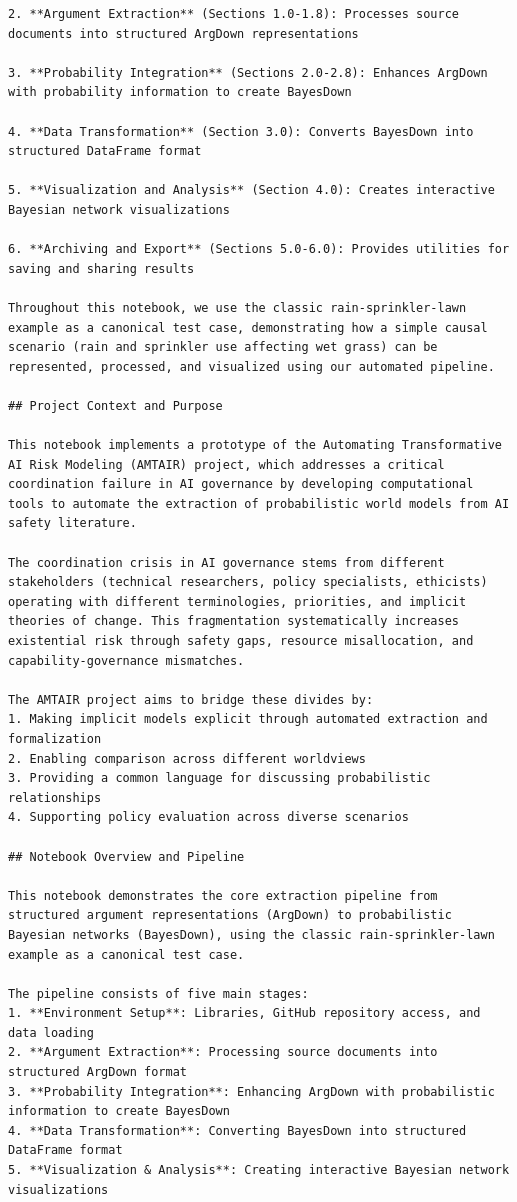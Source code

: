 \documentclass[
  11pt,
  letterpaper,
]{book}
\begin{document}
\begin{verbatim}
2. **Argument Extraction** (Sections 1.0-1.8): Processes source documents into structured ArgDown representations

3. **Probability Integration** (Sections 2.0-2.8): Enhances ArgDown with probability information to create BayesDown

4. **Data Transformation** (Section 3.0): Converts BayesDown into structured DataFrame format

5. **Visualization and Analysis** (Section 4.0): Creates interactive Bayesian network visualizations

6. **Archiving and Export** (Sections 5.0-6.0): Provides utilities for saving and sharing results

Throughout this notebook, we use the classic rain-sprinkler-lawn example as a canonical test case, demonstrating how a simple causal scenario (rain and sprinkler use affecting wet grass) can be represented, processed, and visualized using our automated pipeline.

## Project Context and Purpose

This notebook implements a prototype of the Automating Transformative AI Risk Modeling (AMTAIR) project, which addresses a critical coordination failure in AI governance by developing computational tools to automate the extraction of probabilistic world models from AI safety literature.

The coordination crisis in AI governance stems from different stakeholders (technical researchers, policy specialists, ethicists) operating with different terminologies, priorities, and implicit theories of change. This fragmentation systematically increases existential risk through safety gaps, resource misallocation, and capability-governance mismatches.

The AMTAIR project aims to bridge these divides by:
1. Making implicit models explicit through automated extraction and formalization
2. Enabling comparison across different worldviews
3. Providing a common language for discussing probabilistic relationships
4. Supporting policy evaluation across diverse scenarios

## Notebook Overview and Pipeline

This notebook demonstrates the core extraction pipeline from structured argument representations (ArgDown) to probabilistic Bayesian networks (BayesDown), using the classic rain-sprinkler-lawn example as a canonical test case.

The pipeline consists of five main stages:
1. **Environment Setup**: Libraries, GitHub repository access, and data loading
2. **Argument Extraction**: Processing source documents into structured ArgDown format
3. **Probability Integration**: Enhancing ArgDown with probabilistic information to create BayesDown
4. **Data Transformation**: Converting BayesDown into structured DataFrame format
5. **Visualization & Analysis**: Creating interactive Bayesian network visualizations


\end{verbatim}
\end{document}
